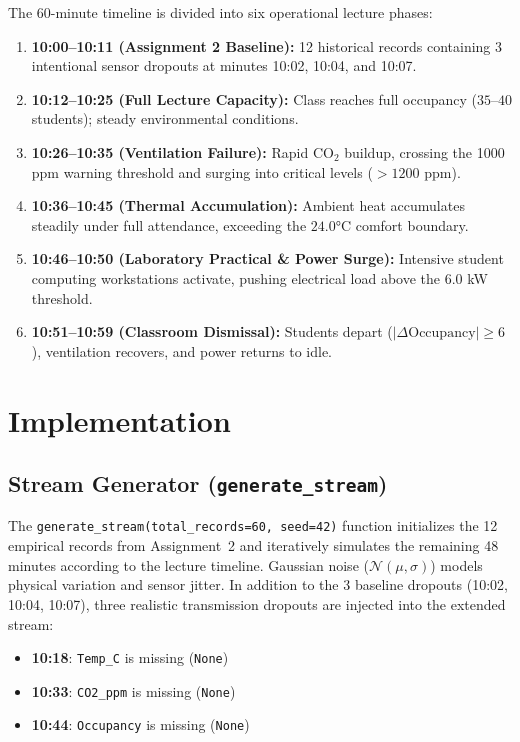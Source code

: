 \documentclass[12pt,a4paper]{article}
\begin{document}
The 60-minute timeline is divided into six operational lecture phases:
\begin{enumerate}
  \item \textbf{10:00--10:11 (Assignment 2 Baseline):} 12 historical records containing 3 intentional sensor dropouts at minutes 10:02, 10:04, and 10:07.
  \item \textbf{10:12--10:25 (Full Lecture Capacity):} Class reaches full occupancy ($35$--$40$ students); steady environmental conditions.
  \item \textbf{10:26--10:35 (Ventilation Failure):} Rapid $\text{CO}_2$ buildup, crossing the 1000 ppm warning threshold and surging into critical levels ($>1200$ ppm).
  \item \textbf{10:36--10:45 (Thermal Accumulation):} Ambient heat accumulates steadily under full attendance, exceeding the $24.0$°C comfort boundary.
  \item \textbf{10:46--10:50 (Laboratory Practical \& Power Surge):} Intensive student computing workstations activate, pushing electrical load above the $6.0$ kW threshold.
  \item \textbf{10:51--10:59 (Classroom Dismissal):} Students depart ($|\Delta\text{Occupancy}| \ge 6$), ventilation recovers, and power returns to idle.
\end{enumerate}

\section{Implementation}
\subsection{Stream Generator (\texttt{generate\_stream})}

The \texttt{generate\_stream(total\_records=60, seed=42)} function initializes the 12 empirical records from Assignment~2 and iteratively simulates the remaining 48 minutes according to the lecture timeline. Gaussian noise ($\mathcal{N}(\mu, \sigma)$) models physical variation and sensor jitter. In addition to the 3 baseline dropouts (10:02, 10:04, 10:07), three realistic transmission dropouts are injected into the extended stream:
\begin{itemize}
  \item \textbf{10:18}: \texttt{Temp\_C} is missing (\texttt{None})
  \item \textbf{10:33}: \texttt{CO2\_ppm} is missing (\texttt{None})
  \item \textbf{10:44}: \texttt{Occupancy} is missing (\texttt{None})
\end{itemize}
\end{document}
